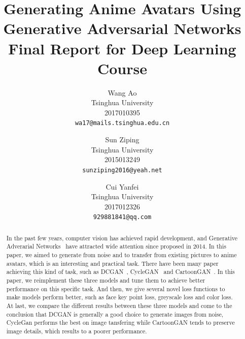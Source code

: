 \documentclass[10pt,twocolumn,letterpaper]{article}
\begin{document}
\title{Generating Anime Avatars Using Generative Adversarial Networks \\
\large Final Report for Deep Learning Course}

\author{Wang Ao\\
Tsinghua University\\
2017010395\\
{\tt\small wa17@mails.tsinghua.edu.cn}
\and
Sun Ziping\\
Tsinghua University\\
2015013249\\
{\tt\small sunziping2016@yeah.net}
\and
Cui Yanfei\\
Tsinghua University\\
2017012326\\
{\tt\small 929881841@qq.com}
}

\maketitle

\begin{abstract}
In the past few years, computer vision has achieved rapid development, and
Generative Adverarial Networks~\cite{GAN} have attracted wide attention since
proposed in 2014. In this paper, we aimed to generate from noise and to transfer
from existing pictures to anime avatars, which is an interesting and practical
task. There have been many paper achieving this kind of task, such as
DCGAN~\cite{DCGAN}, CycleGAN~\cite{CycleGAN2017} and
CartoonGAN~\cite{CartoonGAN}. In this paper, we reimplement these three models
and tune them to achieve better performance on this specific task. And then, we
give several novel loss functions to make models perform better, such as face
key point loss, greyscale loss and color loss. At last, we compare the different
results between these three models and come to the conclusion that DCGAN is
generally a good choice to generate images from noise, CycleGan performs the
best on image tansfering while CartoonGAN tends to preserve image details, which
results to a poorer performance.
\end{abstract}
\end{document}
